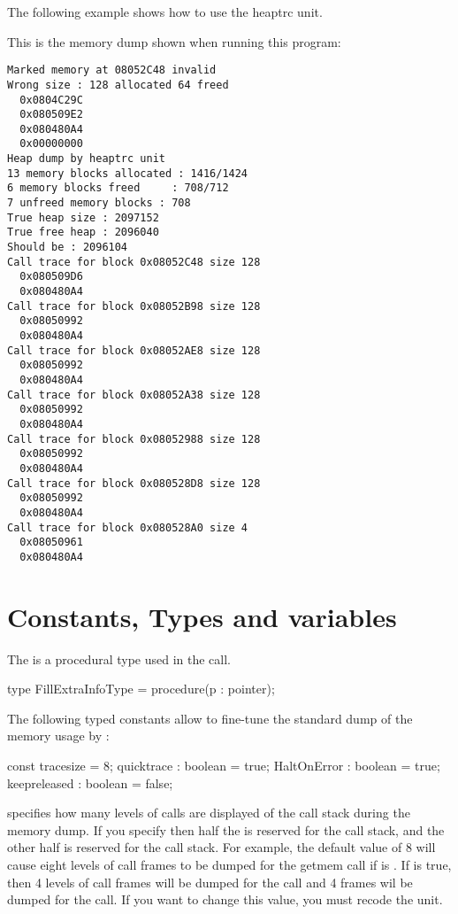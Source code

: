 The following example shows how to use the heaptrc unit.

\html{}

This is the memory dump shown when running this program:
\begin{verbatim}
Marked memory at 08052C48 invalid
Wrong size : 128 allocated 64 freed
  0x0804C29C
  0x080509E2
  0x080480A4
  0x00000000
Heap dump by heaptrc unit
13 memory blocks allocated : 1416/1424
6 memory blocks freed     : 708/712
7 unfreed memory blocks : 708
True heap size : 2097152
True free heap : 2096040
Should be : 2096104
Call trace for block 0x08052C48 size 128
  0x080509D6
  0x080480A4
Call trace for block 0x08052B98 size 128
  0x08050992
  0x080480A4
Call trace for block 0x08052AE8 size 128
  0x08050992
  0x080480A4
Call trace for block 0x08052A38 size 128
  0x08050992
  0x080480A4
Call trace for block 0x08052988 size 128
  0x08050992
  0x080480A4
Call trace for block 0x080528D8 size 128
  0x08050992
  0x080480A4
Call trace for block 0x080528A0 size 4
  0x08050961
  0x080480A4
\end{verbatim}

\section{Constants, Types and variables}

The  is a procedural type used in the
 call.

\begin{listing}
type
    FillExtraInfoType = procedure(p : pointer);
\end{listing}
The following typed constants allow to fine-tune the standard dump of the
memory usage by :

\begin{listing}
const
  tracesize = 8;
  quicktrace : boolean = true;
  HaltOnError : boolean = true;
  keepreleased : boolean = false;
\end{listing}

 specifies how many levels of calls are displayed of the 
call stack during the memory dump. If you specify 
then half the  is reserved for the  call stack, 
and the other half is reserved for the  call stack.
For example, the default value of 8 will cause eight levels of call frames
to be dumped for the getmem call if  is . If
 is true, then 4 levels of call frames will be dumped for
the  call and 4 frames wil be dumped for the  call.
If you want to change this value, you must recode the  unit.

